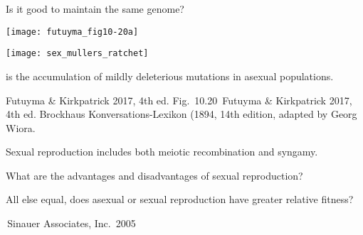 \documentclass[t]{beamer}
\newcommand{\futuyma}[1]{%
	\ifthenelse{\isempty{#1}}%
	{Futuyma \& Kirkpatrick 2017, 4th ed.}%
	{Fig.~#1~Futuyma \& Kirkpatrick 2017, 4th ed.}%
}
\begin{document}

\begin{frame}{Is it good to maintain the same genome?}

\begin{multicols}{2}
\texttt{[image: futuyma\_fig10-20a]}

\columnbreak

\texttt{[image: sex\_mullers\_ratchet]}

\end{multicols}

\pause

\hangpara {} is the accumulation of mildly deleterious mutations in asexual populations.

\vfilll


\tiny \futuyma{10.20} \hfill Brockhaus Konversations-Lexikon (1894, 14th edition, adapted by Georg Wiora.

\end{frame}


\begin{frame}{Sexual reproduction includes both meiotic recombination and syngamy.}



\hangpara What are the advantages and disadvantages of sexual reproduction?

\end{frame}


\begin{frame}{All else equal, does asexual or sexual reproduction have greater relative fitness?}





\tinyfill \textcopyright\,Sinauer Associates, Inc.~2005

\end{frame}
\end{document}

